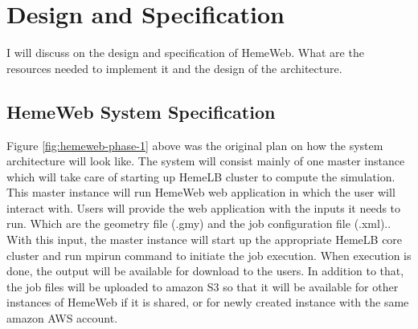  

\chapter[Design and Specification]{Design and Specification}


I will discuss on the design and specification of HemeWeb. What are the resources needed to implement it and the design of the architecture.

\section{HemeWeb System Specification}


\vspace{1cm}

\noindent%
\begin{minipage}{\linewidth}%
\label{fig:hemeweb-phase-1}%
\end{minipage}

\vspace{1cm}

Figure \ref{fig:hemeweb-phase-1} above was the original plan on how the system architecture will look like. The system will consist mainly of one master instance which will take care of starting up HemeLB cluster to compute the simulation. This master instance will run HemeWeb web application in which the user will interact with. Users will provide the web application with the inputs it needs to run. Which are the geometry file (.gmy) and the job configuration file (.xml).. With this input, the master instance will start up the appropriate HemeLB core cluster and run mpirun command to initiate the job execution. When execution is done, the output will be available for download to the users. In addition to that, the job files will be uploaded to amazon S3 so that it will be available for other instances of HemeWeb if it is shared, or for newly created instance with the same amazon AWS account.


